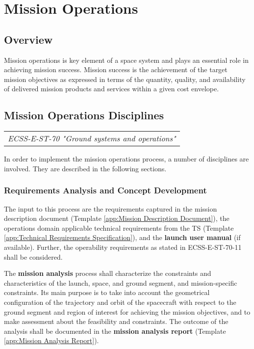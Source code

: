\chapter{Mission Operations}
\label{chap:Mission Operations}

\section{Overview}

Mission operations is key element of a space system and plays an essential role in achieving mission success. Mission success is the achievement of the target mission objectives as expressed in terms of the quantity, quality, and availability of delivered mission products and services within a given cost envelope.

\section{Mission Operations Disciplines}

\begin{tabular}{l}
\textit{ECSS-E-ST-70 "Ground systems and operations" \cite{ECSS-E-ST-70}}
\end{tabular}

In order to implement the mission operations process, a number of disciplines are involved. They are described in the following sections.

\subsection{Requirements Analysis and Concept Development}

The input to this process are the requirements captured in the mission description document (Template \ref{app:Mission Description Document}), the operations domain applicable technical requirements from the TS (Template \ref{app:Technical Requirements Specification}), and the \textbf{launch user manual} (if available). Further, the operability requirements as stated in ECSS-E-ST-70-11 \cite{ECSS-E-ST-70-11} shall be considered.

The \textbf{mission analysis} process shall characterize the constraints and characteristics of the launch, space, and ground segment, and mission-specific constraints. Its main purpose is to take into account the geometrical configuration of the trajectory and orbit of the spacecraft with respect to the ground segment and region of interest for achieving the mission objectives, and to make assessment about the feasibility and constraints. The outcome of the analysis shall be documented in the \textbf{mission analysis report} (Template \ref{app:Mission Analysis Report}).


